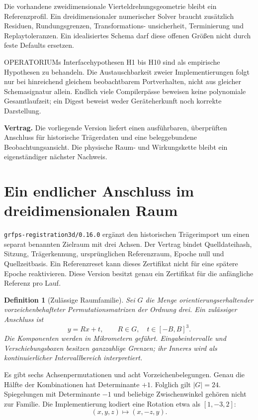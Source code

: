 \documentclass[11pt,a4paper]{article}
\newcommand{\contract}[1]{\vspace{3pt}\noindent\colorbox{pale}{\parbox{\dimexpr\linewidth-2\fboxsep}{\textbf{Vertrag.} #1}}\vspace{5pt}}
\newcommand{\nextsection}[2]{\clearpage{\color{accent}\small\textsf{#1}}\section{#2}}
\newtheorem{definition}[proposition]{Definition}
\begin{document}
Die vorhandene zweidimensionale Vierteldrehungsgeometrie bleibt
ein Referenzprofil. Ein dreidimensionaler numerischer Solver
braucht zusätzlich Residuen, Rundungsgrenzen, Transformations-
unsicherheit, Terminierung und Replaytoleranzen. Ein idealisiertes
Schema darf diese offenen Größen nicht durch feste Defaults ersetzen.

OPERATORIUMs Interfacehypothesen H1 bis H10 sind als empirische
Hypothesen zu behandeln. Die Austauschbarkeit zweier Implementierungen
folgt nur bei hinreichend gleichem beobachtbarem Portverhalten,
nicht aus gleicher Schemasignatur allein. Endlich viele Compilerpässe
beweisen keine polynomiale Gesamtlaufzeit; ein Digest beweist
weder Geräteherkunft noch korrekte Darstellung.

\contract{Die vorliegende Version liefert einen ausführbaren,
überprüften Anschluss für historische Trägerdaten und eine
beleggebundene Beobachtungsansicht. Die physische Raum- und
Wirkungskette bleibt ein eigenständiger nächster Nachweis.}

\nextsection{90 / 3D-REFERENZPROFIL}{Ein endlicher Anschluss im dreidimensionalen Raum}
\texttt{grfps-registration3d/0.16.0} ergänzt den historischen
Trägerimport um einen separat benannten Zielraum mit drei Achsen.
Der Vertrag bindet Quelldateihash, Sitzung, Trägerkennung,
ursprünglichen Referenzraum, Epoche null und Quellzeitbasis.
Ein Referenzreset kann dieses Zertifikat nicht für eine spätere
Epoche reaktivieren. Diese Version besitzt genau ein Zertifikat
für die anfängliche Referenz pro Lauf.

\begin{definition}[Zulässige Raumfamilie]
Sei $G$ die Menge orientierungserhaltender vorzeichenbehafteter
Permutationsmatrizen der Ordnung drei. Ein zulässiger Anschluss ist
\[
 y=Rx+t,\qquad R\in G,\quad t\in[-B,B]^3.
\]
Die Komponenten werden in Mikrometern geführt. Eingabeintervalle
und Verschiebungsboxen besitzen ganzzahlige Grenzen; ihr Inneres
wird als kontinuierlicher Intervallbereich interpretiert.
\end{definition}

Es gibt sechs Achsenpermutationen und acht Vorzeichenbelegungen.
Genau die Hälfte der Kombinationen hat Determinante $+1$.
Folglich gilt $|G|=24$. Spiegelungen mit Determinante $-1$ und
beliebige Zwischenwinkel gehören nicht zur Familie. Die
Implementierung kodiert eine Rotation etwa als $[1,-3,2]$:
\[
 (x,y,z)\longmapsto(x,-z,y).
\]
\end{document}
